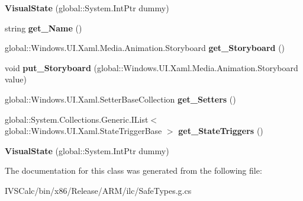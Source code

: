 \begin{DoxyCompactItemize}
\item 
\mbox{\label{class_windows_1_1_u_i_1_1_xaml_1_1_visual_state_a2c46a539387b55802a381e56d280a8ae}} 
{\bfseries Visual\+State} (global\+::\+System.\+Int\+Ptr dummy)
\item 
\mbox{\label{class_windows_1_1_u_i_1_1_xaml_1_1_visual_state_a879a468f5014b12ff6c4d57ff0f58a5b}} 
string {\bfseries get\+\_\+\+Name} ()
\item 
\mbox{\label{class_windows_1_1_u_i_1_1_xaml_1_1_visual_state_a6b5d43fae9eab67c703b75086a08b538}} 
global\+::\+Windows.\+U\+I.\+Xaml.\+Media.\+Animation.\+Storyboard {\bfseries get\+\_\+\+Storyboard} ()
\item 
\mbox{\label{class_windows_1_1_u_i_1_1_xaml_1_1_visual_state_a3b834606f339f18853900acbdc0871b8}} 
void {\bfseries put\+\_\+\+Storyboard} (global\+::\+Windows.\+U\+I.\+Xaml.\+Media.\+Animation.\+Storyboard value)
\item 
\mbox{\label{class_windows_1_1_u_i_1_1_xaml_1_1_visual_state_ac81aee782cc1e2a4470e9847716cafa0}} 
global\+::\+Windows.\+U\+I.\+Xaml.\+Setter\+Base\+Collection {\bfseries get\+\_\+\+Setters} ()
\item 
\mbox{\label{class_windows_1_1_u_i_1_1_xaml_1_1_visual_state_a27eb2311db04fa8c2a18edac2aa49be9}} 
global\+::\+System.\+Collections.\+Generic.\+I\+List$<$ global\+::\+Windows.\+U\+I.\+Xaml.\+State\+Trigger\+Base $>$ {\bfseries get\+\_\+\+State\+Triggers} ()
\item 
\mbox{\label{class_windows_1_1_u_i_1_1_xaml_1_1_visual_state_a2c46a539387b55802a381e56d280a8ae}} 
{\bfseries Visual\+State} (global\+::\+System.\+Int\+Ptr dummy)
\end{DoxyCompactItemize}


The documentation for this class was generated from the following file\+:\begin{DoxyCompactItemize}
\item 
I\+V\+S\+Calc/bin/x86/\+Release/\+A\+R\+M/ilc/Safe\+Types.\+g.\+cs\end{DoxyCompactItemize}
